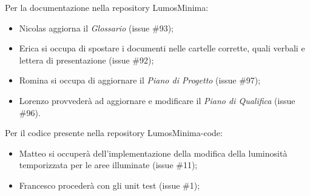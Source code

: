 \documentclass[a4paper, 12pt]{article}
\begin{document}
Per la documentazione nella repository LumosMinima:
\begin{itemize}
    \item Nicolas aggiorna il \textit{Glossario} (issue \#93);
    \item Erica si occupa di spostare i documenti nelle cartelle corrette, quali verbali e lettera di presentazione (issue \#92);
    \item Romina si occupa di aggiornare il \textit{Piano di Progetto} (issue \#97);
    \item Lorenzo provvederà ad aggiornare e modificare il \textit{Piano di Qualifica} (issue \#96).
\end{itemize}

Per il codice presente nella repository LumosMinima-code:
\begin{itemize}
    \item Matteo si occuperà dell'implementazione della modifica della luminosità temporizzata per le aree illuminate (issue \#11);
    \item Francesco procederà con gli unit test (issue \#1);
\end{itemize}
\end{document}

